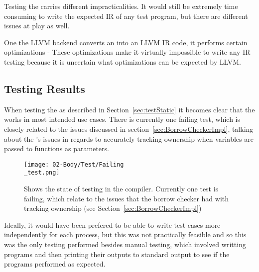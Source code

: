 Testing the \codeGen{} carries different impracticalities. It would still be
extremely time consuming to write the expected IR of any test program, but there are
different issues at play as well. 

One the LLVM backend converts an \ast{} into an LLVM IR code, it performs certain
optimizations - These optimizations make it virtually impossible to write any IR
testing because it is uncertain what optimizations can be expected by LLVM.

\subsection{Testing Results}

When testing the \borrowChecker{} as described in Section~\ref{sec:testStatic} it
becomes clear that the \borrowChecker{} works in most intended use cases. There is
currently one failing test, which is closely related to the issues discussed in
section~\ref{sec:BorrowCheckerImpl}, talking about the \borrowChecker's issues in
regards to accurately tracking ownership when variables are passed to functions as
parameters.

\begin{figure}[ht]
  \texttt{[image: 02-Body/Test/Failing\\\_test.png]}
  \caption{Shows the state of testing in the \lang{} compiler. Currently one test is
  failing, which relate to the issues that the borrow checker had with tracking
ownership (see Section~\ref{sec:BorrowCheckerImpl})}
  \label{fig:failTest}
\end{figure}

Ideally, it would have been prefered to be able to write test cases more
independently for each process, but this was not practically feasible and so this was
the only testing performed besides manual testing, which involved writting programs
and then printing their outputs to standard output to see if the programs performed
as expected.

